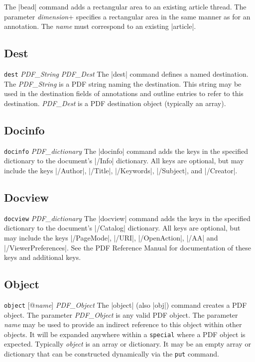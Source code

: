 {{\description
The |bead| command adds a rectangular area to an existing article thread.
The parameter {\it dimension}+ specifies a rectangular area
in the same manner as for an annotation.  The {\it name}
must correspond to an existing |article|.
\example
\begintt
{}
\endtt

\subsection{Dest}
\syntax
{\tt dest} {\it PDF\_String} {\it PDF\_Dest}
\description
The |dest| command defines a named destination.
The {\it PDF\_String} is a PDF string naming
the destination.  This string may be used in the destination
fields of annotations and outline entries to refer to
this destination.  {\it PDF\_Dest} is a PDF
destination object (typically an array).
\example
\begintt
{}
\endtt

\subsection{Docinfo}
\syntax
{\tt docinfo} {\it PDF\_dictionary}
\description
The |docinfo| command adds the keys in the specified dictionary to the
document's |/Info| dictionary.  All keys are optional, but may include
the keys |/Author|, |/Title|, |/Keywords|, |/Subject|,
and |/Creator|.
\example
\begintt
{}
\endtt

\subsection{Docview}
\syntax
{\tt docview} {\it PDF\_dictionary}
\description
The |docview| command adds the keys in the specified dictionary to the
document's |/Catalog| dictionary.  All keys are optional, but may include
the keys |/PageMode|,
|/URI|, |/OpenAction|, |/AA|
and |/ViewerPreferences|.  See the PDF Reference Manual
for documentation of these keys and additional keys.
\example
\begintt
{}
\endtt


\subsection{Object}
\syntax
{\tt object} [@{\it name}] {\it PDF\_Object}
\description
The |object| (also |obj|) command creates a
PDF object.  The parameter {\it PDF\_Object} is any valid PDF object.  The
parameter {\it name} may be used to provide an indirect reference
to this object within other
objects. It will be expanded anywhere within
a {\tt special} where a PDF object is
expected. Typically {\it object} is an array
or dictionary.  It may be an empty array or
dictionary that can be constructed dynamically via
the {\tt put} command.
\example
\begintt
{}
\endtt

}}
